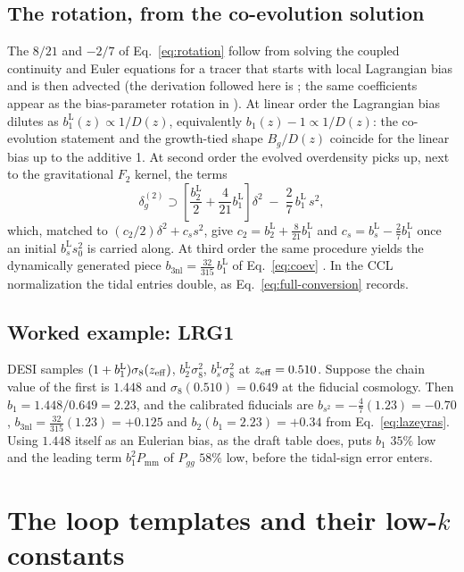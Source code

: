 \documentclass[11pt]{article}
\newcommand{\bone}{b_1}            %
\newcommand{\btwo}{b_2}            %
\newcommand{\bs}{b_{s^2}}          %
\newcommand{\bthree}{b_{3\mathrm{nl}}} %
\newcommand{\boneL}{b_1^{\mathrm{L}}}
\newcommand{\btwoL}{b_2^{\mathrm{L}}}
\newcommand{\bsL}{b_s^{\mathrm{L}}}
\newcommand{\pnl}{P_{\mathrm{mm}}}
\begin{document}
\subsection{The rotation, from the co-evolution solution}

The $8/21$ and $-2/7$ of Eq.~\eqref{eq:rotation} follow from solving
the coupled continuity and Euler equations for a tracer that starts
with local Lagrangian bias and is then advected (the derivation
followed here is \cite{Saito2014}; the same coefficients appear as
the bias-parameter rotation in \cite{ChenVlahWhite2020}).  At linear
order the Lagrangian bias dilutes as
$\boneL(z) \propto 1/D(z)$, equivalently
$\bone(z) - 1 \propto 1/D(z)$: the co-evolution statement and the
growth-tied shape $B_g/D(z)$ coincide for the linear bias up to the
additive 1.  At second order the evolved overdensity picks up, next to
the gravitational $F_2$ kernel, the terms
\begin{equation}
\delta_g^{(2)} \supset
 \left[\frac{\btwoL}{2} + \frac{4}{21}\boneL\right]\delta^2
 \;-\; \frac{2}{7}\,\boneL\,s^2 ,
\end{equation}
which, matched to $(c_2/2)\delta^2 + c_s s^2$, give
$c_2 = \btwoL + \tfrac{8}{21}\boneL$ and
$c_s = \bsL - \tfrac{2}{7}\boneL$ once an initial $\bsL s_0^2$ is
carried along.  At third order the same procedure yields the
dynamically generated piece
$\bthree = \tfrac{32}{315}\,\boneL$ of Eq.~\eqref{eq:coev}
\cite{Saito2014}.  In the CCL normalization the tidal entries double,
as Eq.~\eqref{eq:full-conversion} records.

\subsection{Worked example: LRG1}

DESI samples $(1+\boneL)\sigma_8(z_{\rm eff})$,
$\btwoL\sigma_8^2$, $\bsL\sigma_8^2$ at
$z_{\rm eff} = 0.510$.  Suppose the chain value of the first is
$1.448$ and $\sigma_8(0.510) = 0.649$ at the fiducial cosmology.
Then $\bone = 1.448/0.649 = 2.23$, and the calibrated fiducials are
$\bs = -\tfrac{4}{7}(1.23) = -0.70$,
$\bthree = \tfrac{32}{315}(1.23) = +0.125$ and
$\btwo(\bone{=}2.23) = +0.34$ from Eq.~\eqref{eq:lazeyras}.  Using
$1.448$ itself as an Eulerian bias, as the draft table does, puts
$\bone$ $35\%$ low and the leading term $\bone^2\pnl$ of $P_{gg}$
$58\%$ low, before the tidal-sign error enters.

\section{The loop templates and their low-\texorpdfstring{$k$}{k} constants}
\label{app:loops}
\end{document}
